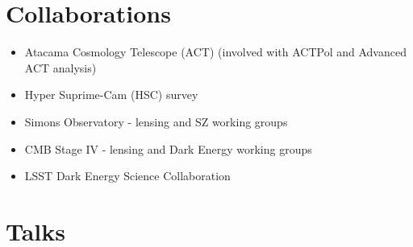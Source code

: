 \documentclass[10pt,margin]{res}
\begin{document}
\begin{resume}
\section{Collaborations}
\begin{itemize}
\item Atacama Cosmology Telescope (ACT) (involved with ACTPol and Advanced ACT analysis)
\item Hyper Suprime-Cam (HSC) survey
\item Simons Observatory - lensing and SZ working groups
\item CMB Stage IV - lensing and Dark Energy working groups
\item LSST Dark Energy Science Collaboration
\end{itemize}

\section{Talks}


\end{resume}
\end{document}
